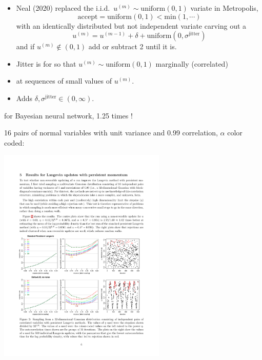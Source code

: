 \documentclass[10pt]{report}
\newcommand{\draw}[2]{#1^{(#2)}}
\begin{document}
\begin{itemize}
\item Neal (2020) replaced the i.i.d.\ $\draw{u}{m} \sim \textrm{uniform}(0, 1)$
  variate in Metropolis,
  $$
  \textrm{accept} = \textrm{uniform}(0, 1)
  < \textrm{min}(1, \cdots)
  $$
  with an identically distributed but not independent variate carving out a
  $$
  \draw{u}{m} = \draw{u}{m-1} + \delta + \textrm{uniform}(0,
  \sigma^{\textrm{jitter}})
  $$
  and if $\draw{u}{m} \not\in (0, 1)$ add or subtract 2 until it is.
\item Jitter is for  so that $\draw{u}{m} \sim
  \textrm{uniform}(0, 1)$ marginally (correlated)
\item {} at sequences of small values of $\draw{u}{m}$.
\item Adds  $\delta,
  \sigma^{\textrm{jitter}} \in (0, \infty)$.
\end{itemize}

\begin{subitemize}
  \vspace*{-3pt}
  \item for Bayesian neural network, 1.25 times !
    \vspace*{-4pt}
  \item 16 pairs of normal variables with unit variance and 0.99
    correlation, $\alpha$ color coded:
  \end{subitemize}
\begin{center}
  \vspace*{-3pt}
  \includegraphics[width=0.6\textwidth]{img/neal-nonrevu.pdf}
\end{center}
\end{document}

